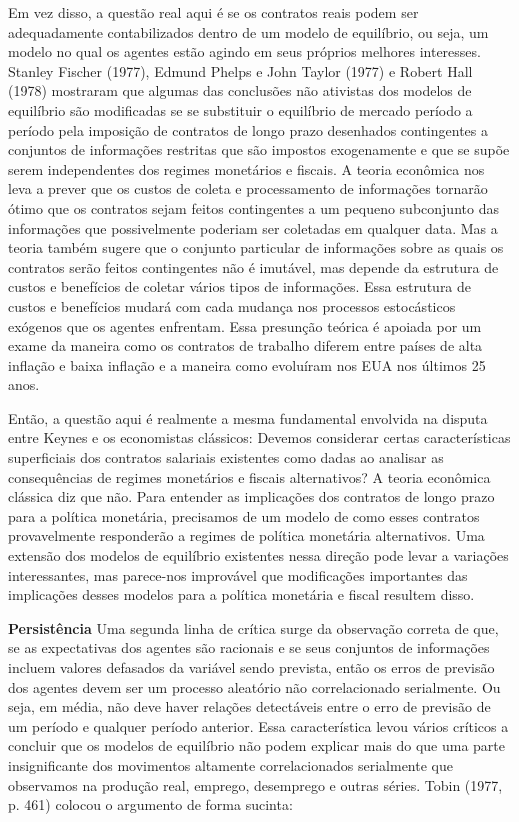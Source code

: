 \documentclass[12pt]{article}
\begin{document}
Em vez disso, a questão real aqui é se os contratos reais podem ser adequadamente contabilizados dentro de um modelo de equilíbrio, ou seja, um modelo no qual os agentes estão agindo em seus próprios melhores interesses. Stanley Fischer (1977), Edmund Phelps e John Taylor (1977) e Robert Hall (1978) mostraram que algumas das conclusões não ativistas dos modelos de equilíbrio são modificadas se se substituir o equilíbrio de mercado período a período pela imposição de contratos de longo prazo desenhados contingentes a conjuntos de informações restritas que são impostos exogenamente e que se supõe serem independentes dos regimes monetários e fiscais. A teoria econômica nos leva a prever que os custos de coleta e processamento de informações tornarão ótimo que os contratos sejam feitos contingentes a um pequeno subconjunto das informações que possivelmente poderiam ser coletadas em qualquer data. Mas a teoria também sugere que o conjunto particular de informações sobre as quais os contratos serão feitos contingentes não é imutável, mas depende da estrutura de custos e benefícios de coletar vários tipos de informações. Essa estrutura de custos e benefícios mudará com cada mudança nos processos estocásticos exógenos que os agentes enfrentam. Essa presunção teórica é apoiada por um exame da maneira como os contratos de trabalho diferem entre países de alta inflação e baixa inflação e a maneira como evoluíram nos EUA nos últimos 25 anos.

Então, a questão aqui é realmente a mesma fundamental envolvida na disputa entre Keynes e os economistas clássicos: Devemos considerar certas características superficiais dos contratos salariais existentes como dadas ao analisar as consequências de regimes monetários e fiscais alternativos? A teoria econômica clássica diz que não. Para entender as implicações dos contratos de longo prazo para a política monetária, precisamos de um modelo de como esses contratos provavelmente responderão a regimes de política monetária alternativos. Uma extensão dos modelos de equilíbrio existentes nessa direção pode levar a variações interessantes, mas parece-nos improvável que modificações importantes das implicações desses modelos para a política monetária e fiscal resultem disso.

\textbf{Persistência}
Uma segunda linha de crítica surge da observação correta de que, se as expectativas dos agentes são racionais e se seus conjuntos de informações incluem valores defasados da variável sendo prevista, então os erros de previsão dos agentes devem ser um processo aleatório não correlacionado serialmente. Ou seja, em média, não deve haver relações detectáveis entre o erro de previsão de um período e qualquer período anterior. Essa característica levou vários críticos a concluir que os modelos de equilíbrio não podem explicar mais do que uma parte insignificante dos movimentos altamente correlacionados serialmente que observamos na produção real, emprego, desemprego e outras séries. Tobin (1977, p. 461) colocou o argumento de forma sucinta:
\end{document}
